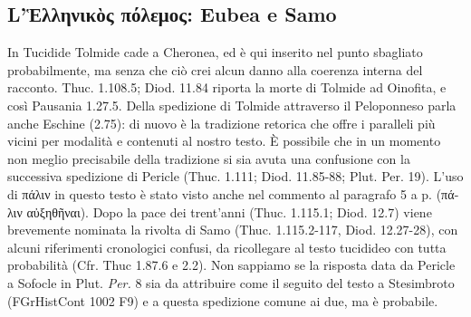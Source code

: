 {            \subsection*{L'\textgreek{Ἑλληνικὸς πόλεμος}: Eubea e Samo}
            In Tucidide Tolmide cade a Cheronea, ed è qui inserito nel punto sbagliato probabilmente, ma senza che ciò crei alcun danno alla coerenza interna del racconto. Thuc. 1.108.5; Diod. 11.84 riporta la morte di Tolmide ad Oinofita, e così Pausania 1.27.5. Della spedizione di Tolmide attraverso il Peloponneso parla anche Eschine (2.75): di nuovo è la tradizione retorica che offre i paralleli più vicini per modalità e contenuti al nostro testo. È possibile che in un momento non meglio precisabile della tradizione si sia avuta una confusione con la successiva spedizione di Pericle  (Thuc. 1.111; Diod. 11.85-88; Plut. Per. 19).
            L'uso di \textgreek{πάλιν} in questo testo è stato visto anche nel commento al paragrafo 5 a p.\pageref{bkm:RefHeading697021501267828} (\textgreek{πάλιν αὐξηθῆναι}). Dopo la pace dei trent'anni (Thuc. 1.115.1; Diod. 12.7) viene brevemente nominata la rivolta di Samo (Thuc. 1.115.2-117, Diod. 12.27-28), con alcuni riferimenti cronologici confusi, da ricollegare al testo tucidideo con tutta probabilità (Cfr. Thuc 1.87.6 e 2.2). Non sappiamo se la risposta data da Pericle  a Sofocle in Plut. \emph{Per.} 8 sia da attribuire come il seguito del testo a Stesimbroto (FGrHistCont 1002 F9) e a questa spedizione comune ai due, ma è probabile.
}
